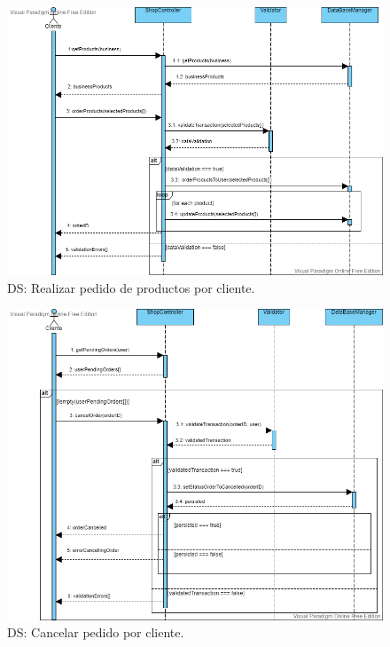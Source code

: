 \begin{figure}[H]
  \centering
  \includegraphics[scale=0.42]{images/Realizar_Pedido.png}
  \caption{DS: Realizar pedido de productos por cliente.}
  \label{DS1}
\end{figure}

\begin{figure}[H]
  \centering
  \includegraphics[scale=0.42]{images/Cancelar_Pedido.png}
  \caption{DS: Cancelar pedido por cliente.}
  \label{DS1}
\end{figure}

